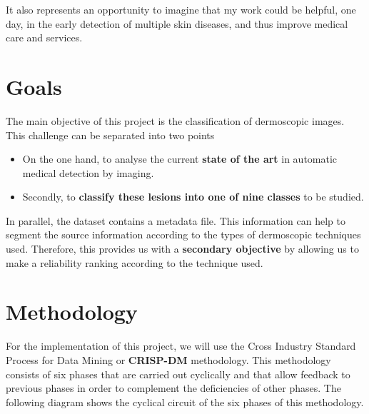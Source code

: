 It also represents an opportunity to imagine that my work could be helpful, one day, in the early detection of multiple skin diseases, and thus improve medical care and services.



\section{Goals}


The main objective of this project is the classification of dermoscopic images. This challenge can be separated into two points

\begin{itemize}
    \item On the one hand, to analyse the current \textbf{state of the art} in automatic medical detection by imaging.
    \item Secondly, to \textbf{classify these lesions into one of nine classes} to be studied.
\end{itemize}

In parallel, the dataset contains a metadata file. This information can help to segment the source information according to the types of dermoscopic techniques used. Therefore, this provides us with a \textbf{secondary objective} by allowing us to make a reliability ranking according to the technique used. 


\section{Methodology}


For the implementation of this project, we will use the Cross Industry Standard Process for Data Mining or \textbf{CRISP-DM} methodology. This methodology consists of six phases that are carried out cyclically and that allow feedback to previous phases in order to complement the deficiencies of other phases. The following diagram shows the cyclical circuit of the six phases of this methodology.

